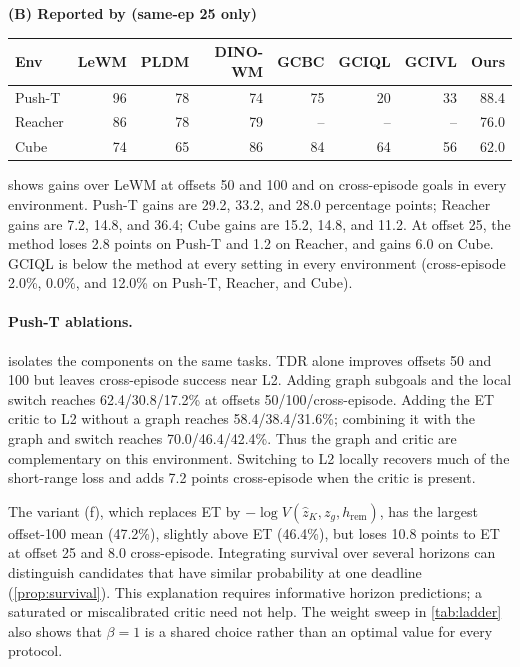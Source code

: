 \documentclass{article} %
\theoremstyle{definition}
\theoremstyle{remark}
\begin{document}
\begin{table}[t]
\bigskip
\textbf{(B) Reported by \citet{lewm} (same-ep 25 only)}\par\smallskip
\begin{tabular}{lrrrrrr|r}
\toprule
Env & LeWM & PLDM & DINO-WM & GCBC & GCIQL & GCIVL & Ours \\
\midrule
Push-T & 96 & 78 & 74 & 75 & 20 & 33 & 88.4 \\
Reacher & 86 & 78 & 79 & -- & -- & -- & 76.0 \\
Cube & 74 & 65 & 86 & 84 & 64 & 56 & 62.0 \\
\bottomrule
\end{tabular}
\end{table}

 shows gains over LeWM at offsets 50 and 100 and on cross-episode goals
in every environment. Push-T gains are 29.2, 33.2, and 28.0 percentage points;
Reacher gains are 7.2, 14.8, and 36.4; Cube gains are 15.2, 14.8, and 11.2.
At offset 25, the method loses 2.8 points on Push-T and 1.2 on Reacher, and gains
6.0 on Cube. GCIQL is below the method at every setting in every environment
(cross-episode 2.0\%, 0.0\%, and 12.0\% on Push-T, Reacher, and Cube).

\paragraph{Push-T ablations.}
\label{sec:ablation}
 isolates the components on the same tasks.
TDR alone improves offsets 50 and 100 but leaves cross-episode success near L2.
Adding graph subgoals and the local switch reaches 62.4/30.8/17.2\% at
offsets 50/100/cross-episode. Adding the ET critic to L2 without a graph reaches 58.4/38.4/31.6\%;
combining it with the graph and switch reaches 70.0/46.4/42.4\%.
Thus the graph and critic are complementary on this environment.
Switching to L2 locally recovers much of the short-range loss and adds 7.2 points
cross-episode when the critic is present.

The variant (f), which replaces ET by $-\log V(\hat z_K,z_g,h_{\mathrm{rem}})$, has the largest
offset-100 mean (47.2\%), slightly above
ET (46.4\%), but loses 10.8 points to ET at offset 25 and 8.0 cross-episode.
Integrating survival over several horizons can distinguish candidates that have
similar probability at one deadline (\cref{prop:survival}).
This explanation requires informative horizon predictions; a saturated or miscalibrated
critic need not help. The weight sweep in \cref{tab:ladder} also shows that
$\beta=1$ is a shared choice rather than an optimal value for every protocol.
\end{document}
